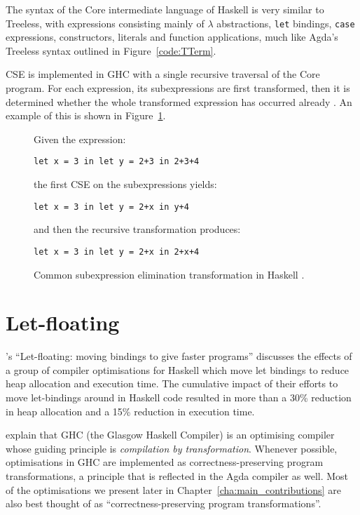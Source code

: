 The syntax of the Core intermediate language of Haskell is very similar to Treeless, with expressions consisting mainly of $\lambda$ abstractions, \lstinline{let} bindings, \lstinline{case} expressions, constructors, literals and function applications, much like Agda's Treeless syntax outlined in Figure~\ref{code:TTerm}.

CSE is implemented in GHC with a single recursive traversal of the Core program. For each expression, its subexpressions are first transformed, then it is determined whether the whole transformed expression has occurred already \citep{Chitil-1998}. An example of this is shown in Figure~\ref{code:cse_haskell}.

\begin{figure}[h]
Given the expression:

\lstinline{let x = 3 in let y = 2+3 in 2+3+4}

the first CSE on the subexpressions yields:

\lstinline{let x = 3 in let y = 2+x in y+4}

and then the recursive transformation produces:

\lstinline{let x = 3 in let y = 2+x in 2+x+4}

\caption{Common subexpression elimination transformation in Haskell \citep{Chitil-1998}.}
\label{code:cse_haskell}
\end{figure}

\section{Let-floating}
\label{sec:let_floating}

\citet{jones1996}'s ``Let-floating: moving bindings to give faster programs'' discusses the effects of a group of compiler optimisations for Haskell which move let bindings to reduce heap allocation and execution time. The cumulative impact of their efforts to move let-bindings around in Haskell code resulted in more than a 30\% reduction in heap allocation and a 15\% reduction in execution time.

\citet{jones1996} explain that GHC (the Glasgow Haskell Compiler) is an optimising compiler whose guiding principle is \textit{compilation by transformation}. Whenever possible, optimisations in GHC are implemented as correctness-preserving program transformations, a principle that is reflected in the Agda compiler as well. Most of the optimisations we present later in Chapter~\ref{cha:main_contributions} are also best thought of as ``correctness-preserving program transformations''.

